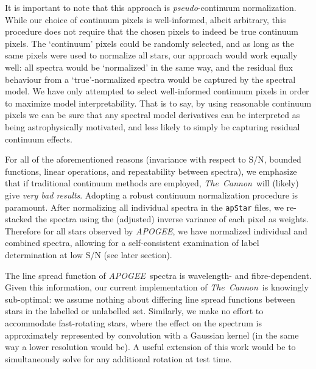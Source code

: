 \documentclass[12pt,preprint]{aastex}
\newcommand{\project}[1]{\textsl{#1}}
\newcommand{\TheCannon}{\project{The~Cannon}}
\newcommand{\tc}{\TheCannon}
\newcommand{\acronym}[1]{{\small{#1}}}
\newcommand{\apogee}{\project{\acronym{APOGEE}}}
\begin{document}
It is important to note that this approach is \emph{pseudo}-continuum normalization.
While our choice of continuum pixels is well-informed, albeit arbitrary, this
procedure does not require that the chosen pixels to indeed be true continuum
pixels.  The `continuum' pixels could be randomly selected, and as long as the
same pixels were used to normalize all stars, our approach would work equally
well: all spectra would be `normalized' in the same way, and the residual flux
behaviour from a `true'-normalized spectra would be captured by the spectral
model.  We have only attempted to select well-informed 
continuum pixels in order to maximize model interpretability.  That is to say,
by using reasonable continuum pixels we can be sure that any spectral model
derivatives can be interpreted as being astrophysically motivated, and less likely to
simply be capturing residual continuum effects.


For all of the aforementioned reasons (invariance with respect to S/N, bounded
functions, linear operations, and repeatability between spectra), we emphasize
that if traditional continuum methods are employed, \TheCannon\ will (likely) 
give \emph{very bad results}.  Adopting a robust continuum normalization 
procedure is paramount.  After normalizing all individual spectra in the
\texttt{apStar} files, we re-stacked the spectra using the (adjusted) inverse variance of
each pixel as weights.  Therefore for all stars observed by
\apogee, we have normalized individual and combined spectra, allowing for 
a self-consistent examination of label determination at low S/N (see later section).



The line spread function of \apogee\ spectra is wavelength- and fibre-dependent.
Given this information, our current implementation of \tc\ is knowingly 
sub-optimal: we assume nothing about differing line spread functions between 
stars in the labelled or unlabelled set. Similarly, we make no effort to 
accommodate fast-rotating stars, where the effect on the spectrum is 
approximately represented by convolution with a Gaussian kernel (in the same way
a lower resolution would be).  A useful extension of this work would be to 
simultaneously solve for any additional rotation at test time.
\end{document}
